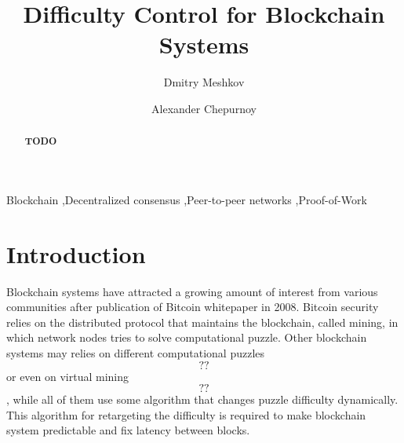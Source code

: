 \documentclass[number,preprint,review]{elsarticle}
\begin{document}
\begin{frontmatter}



\title{Difficulty Control for Blockchain Systems}



\author[iohk]{Dmitry Meshkov}

\author[iohk]{Alexander Chepurnoy}


\address[iohk]{IOHK Research}

\begin{abstract}
\textbf{TODO}
\end{abstract}

\begin{keyword}
Blockchain \sep Decentralized consensus \sep Peer-to-peer networks \sep Proof-of-Work
\end{keyword}

\end{frontmatter}


\section{Introduction}

Blockchain systems have attracted a growing amount of interest from various communities after publication of Bitcoin whitepaper \cite{Nakamoto2008} in 2008.
Bitcoin security relies on the distributed protocol that maintains the blockchain, called mining, in which network nodes tries to solve computational puzzle.
Other blockchain systems may relies on different computational puzzles \[??\] or even on virtual mining \[??\], while all of them use some algorithm that changes puzzle difficulty dynamically.
This algorithm for retargeting the difficulty is required to make blockchain system predictable and fix latency between blocks.
\end{document}

